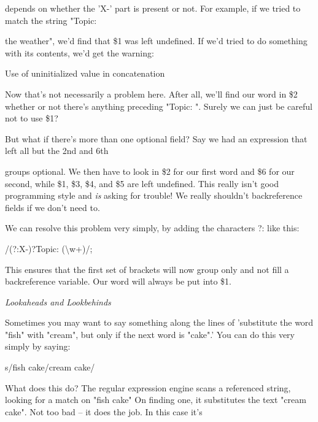 \documentclass[a4paper,11pt]{book}
\begin{document}
\noindent depends on whether the 'X-' part is present or not. For example, if we tried to match the string "Topic:

\noindent the weather", we'd find that \$1 was left undefined. If we'd tried to do something with its contents, we'd get the warning:

\noindent 

\noindent Use of uninitialized value in concatenation

\noindent 

\noindent Now that's not necessarily a problem here. After all, we'll find our word in \$2 whether or not there's anything preceding "Topic: ". Surely we can just be careful not to use \$1?

\noindent 

\noindent But what if there's more than one optional field? Say we had an expression that left all but the 2nd   and 6th

\noindent groups optional. We then have to look in \$2 for our first word and \$6 for our second, while \$1, \$3, \$4, and \$5 are left undefined. This really isn't good programming style and \textit{is }asking for trouble! We really shouldn't backreference fields if we don't need to.

\noindent 

\noindent 

\noindent We can resolve this problem very simply, by adding the characters ?: like this:

\noindent 

\noindent /(?:X-)?Topic: (\textbackslash w+)/;

\noindent 

\noindent This ensures that the first set of brackets will now group only and not fill a backreference variable. Our word will always be put into \$1.

\noindent 

\noindent \textit{Lookaheads and Lookbehinds}

\noindent Sometimes you may want to say something along the lines of 'substitute the word "fish" with "cream", but only if the next word is "cake".' You can do this very simply by saying:

\noindent 

\noindent s/fish cake/cream cake/

\noindent 

\noindent What does this do? The regular expression engine scans a referenced string, looking for a match on "fish cake" On finding one, it substitutes the text "cream cake". Not too bad -- it does the job. In this case it's
\end{document}
